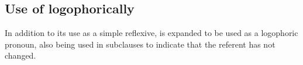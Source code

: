 \subsection{Use of  logophorically}

In addition to its use as a simple reflexive,  is expanded to be used as a logophoric pronoun, also being used in subclauses to indicate that the referent has not changed.

\pex
\a
{}\\
\a
{}\\
\xe